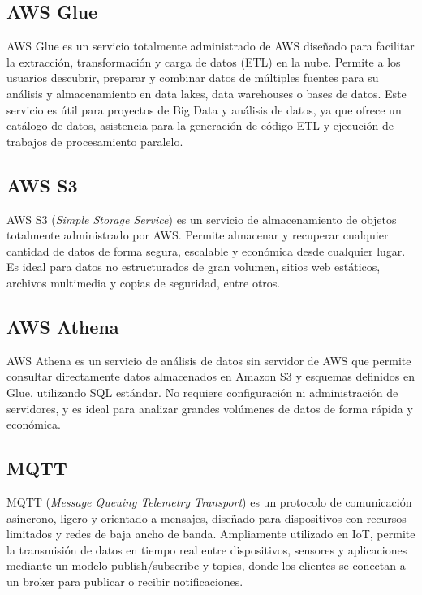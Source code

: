 \subsection{AWS Glue}

AWS Glue \citep{aws_glue} es un servicio totalmente administrado de AWS diseñado para facilitar la extracción, transformación y carga de datos (ETL) en la nube. Permite a los usuarios descubrir, preparar y combinar datos de múltiples fuentes para su análisis y almacenamiento en data lakes, data warehouses o bases de datos. Este servicio es útil para proyectos de Big Data y análisis de datos, ya que ofrece un catálogo de datos, asistencia para la generación de código ETL y ejecución de trabajos de procesamiento paralelo.



\subsection{AWS S3}

AWS S3 (\textit{Simple Storage Service}) \citep{aws_s3} es un servicio de almacenamiento de objetos totalmente administrado por AWS. Permite almacenar y recuperar cualquier cantidad de datos de forma segura, escalable y económica desde cualquier lugar. Es ideal para datos no estructurados de gran volumen, sitios web estáticos, archivos multimedia y copias de seguridad, entre otros.


\subsection{AWS Athena}

AWS Athena \citep{aws_athena} es un servicio de análisis de datos sin servidor de AWS que permite consultar directamente datos almacenados en Amazon S3 y esquemas definidos en Glue, utilizando SQL estándar. No requiere configuración ni administración de servidores, y es ideal para analizar grandes volúmenes de datos de forma rápida y económica.



\subsection{MQTT}

MQTT (\textit{Message Queuing Telemetry Transport}) \citep{mqtt_spec} es un protocolo de comunicación asíncrono, ligero y orientado a mensajes, diseñado para dispositivos con recursos limitados y redes de baja ancho de banda. Ampliamente utilizado en IoT, permite la transmisión de datos en tiempo real entre dispositivos, sensores y aplicaciones mediante un modelo publish/subscribe y topics, donde los clientes se conectan a un broker para publicar o recibir notificaciones.

